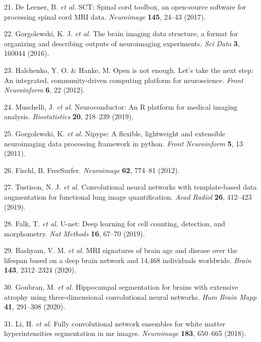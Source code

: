 \documentclass[12pt,]{article}
\begin{document}
\leavevmode\hypertarget{ref-De-Leener:2017aa}{}%
21. De Leener, B. \emph{et al.} SCT: Spinal cord toolbox, an open-source
software for processing spinal cord MRI data. \emph{Neuroimage}
\textbf{145}, 24--43 (2017).

\leavevmode\hypertarget{ref-Gorgolewski:2016aa}{}%
22. Gorgolewski, K. J. \emph{et al.} The brain imaging data structure, a
format for organizing and describing outputs of neuroimaging
experiments. \emph{Sci Data} \textbf{3}, 160044 (2016).

\leavevmode\hypertarget{ref-Halchenko:2012aa}{}%
23. Halchenko, Y. O. \& Hanke, M. Open is not enough. Let's take the
next step: An integrated, community-driven computing platform for
neuroscience. \emph{Front Neuroinform} \textbf{6}, 22 (2012).

\leavevmode\hypertarget{ref-Muschelli:2019aa}{}%
24. Muschelli, J. \emph{et al.} Neuroconductor: An R platform for
medical imaging analysis. \emph{Biostatistics} \textbf{20}, 218--239
(2019).

\leavevmode\hypertarget{ref-Gorgolewski:2011aa}{}%
25. Gorgolewski, K. \emph{et al.} Nipype: A flexible, lightweight and
extensible neuroimaging data processing framework in python. \emph{Front
Neuroinform} \textbf{5}, 13 (2011).

\leavevmode\hypertarget{ref-Fischl:2012aa}{}%
26. Fischl, B. FreeSurfer. \emph{Neuroimage} \textbf{62}, 774--81
(2012).

\leavevmode\hypertarget{ref-Tustison:2019ac}{}%
27. Tustison, N. J. \emph{et al.} Convolutional neural networks with
template-based data augmentation for functional lung image
quantification. \emph{Acad Radiol} \textbf{26}, 412--423 (2019).

\leavevmode\hypertarget{ref-Falk:2019aa}{}%
28. Falk, T. \emph{et al.} U-net: Deep learning for cell counting,
detection, and morphometry. \emph{Nat Methods} \textbf{16}, 67--70
(2019).

\leavevmode\hypertarget{ref-Bashyam:2020aa}{}%
29. Bashyam, V. M. \emph{et al.} MRI signatures of brain age and disease
over the lifespan based on a deep brain network and 14,468 individuals
worldwide. \emph{Brain} \textbf{143}, 2312--2324 (2020).

\leavevmode\hypertarget{ref-Goubran:2020aa}{}%
30. Goubran, M. \emph{et al.} Hippocampal segmentation for brains with
extensive atrophy using three-dimensional convolutional neural networks.
\emph{Hum Brain Mapp} \textbf{41}, 291--308 (2020).

\leavevmode\hypertarget{ref-Li:2018aa}{}%
31. Li, H. \emph{et al.} Fully convolutional network ensembles for white
matter hyperintensities segmentation in mr images. \emph{Neuroimage}
\textbf{183}, 650--665 (2018).
\end{document}
